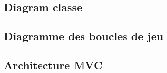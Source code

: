 \subsection{Diagram classe}


\subsection{Diagramme des boucles de jeu}


\subsection{Architecture MVC}


